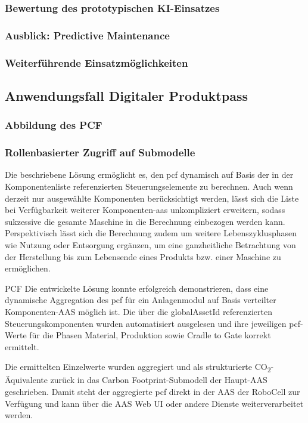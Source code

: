 \subsubsection{Bewertung des prototypischen KI-Einsatzes}
\subsubsection{Ausblick: Predictive Maintenance}
\subsubsection{Weiterführende Einsatzmöglichkeiten}

\subsection{Anwendungsfall Digitaler Produktpass}
\subsubsection{Abbildung des PCF}
\subsubsection{Rollenbasierter Zugriff auf Submodelle}

Die beschriebene Lösung ermöglicht es, den \acs{pcf} dynamisch auf Basis der in der Komponentenliste referenzierten Steuerungselemente zu berechnen. 
Auch wenn derzeit nur ausgewählte Komponenten berücksichtigt werden, lässt sich die Liste bei Verfügbarkeit weiterer Komponenten-\acs{aas} unkompliziert erweitern, sodass sukzessive die gesamte Maschine in die Berechnung einbezogen werden kann. 
Perspektivisch lässt sich die Berechnung zudem um weitere Lebenszyklusphasen wie Nutzung oder Entsorgung ergänzen, um eine ganzheitliche Betrachtung von der Herstellung bis zum Lebensende eines Produkts bzw. einer Maschine zu ermöglichen.


PCF
Die entwickelte Lösung konnte erfolgreich demonstrieren, dass eine dynamische Aggregation des \acs{pcf} für ein Anlagenmodul auf Basis verteilter Komponenten-AAS möglich ist. Die über die globalAssetId referenzierten Steuerungskomponenten wurden automatisiert ausgelesen und ihre jeweiligen \acs{pcf}-Werte für die Phasen Material, Produktion sowie Cradle to Gate korrekt ermittelt.

Die ermittelten Einzelwerte wurden aggregiert und als strukturierte CO\textsubscript{2}-Äquivalente zurück in das Carbon Footprint-Submodell der Haupt-AAS geschrieben. Damit steht der aggregierte \acs{pcf} direkt in der AAS der RoboCell zur Verfügung und kann über die AAS Web UI oder andere Dienste weiterverarbeitet werden.


